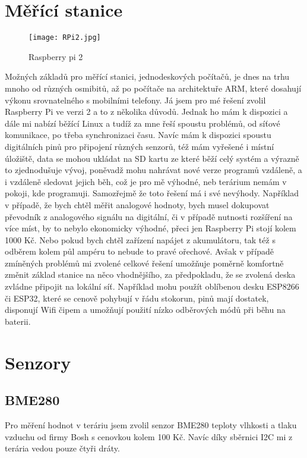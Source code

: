 
\section{Měřící stanice}
\begin{figure}[H]
    \centering
    \texttt{[image: RPi2.jpg]}
    \caption{Raspberry pi 2}
\end{figure}
Možných základů pro měřící stanici, jednodeskových počítačů, je dnes na trhu mnoho od různých osmibitů, až po počítače 
na architektuře ARM,  které dosahují výkonu srovnatelného s mobilními telefony. Já jsem pro mé řešení zvolil Raspberry 
Pi ve verzi 2 a to z několika důvodů. Jednak ho mám k dispozici a dále mi nabízí běžící Linux a tudíž za mne řeší 
spoustu problémů, od síťové komunikace, po třeba synchronizaci času. Navíc mám k dispozici spoustu digitálních pinů pro 
připojení různých senzorů, též mám vyřešené i místní úložiště, data se mohou ukládat na SD kartu ze které běží celý 
systém a výrazně to zjednodušuje vývoj, poněvadž mohu nahrávat nové verze programů vzdáleně, a i vzdáleně sledovat 
jejich běh, což je pro mě výhodné, neb terárium nemám v pokoji, kde programuji. Samozřejmě že toto řešení má i své 
nevýhody. Například v případě, že bych chtěl měřit analogové hodnoty, bych musel dokupovat převodník z analogového 
signálu na digitální, či v případě nutnosti rozšíření na více míst, by to nebylo ekonomicky výhodné, přeci jen Raspberry 
Pi stojí kolem 1000 Kč. Nebo pokud bych chtěl zařízení napájet z akumulátoru, tak též s odběrem kolem půl ampéru to 
nebude to pravé ořechové. Avšak v případě zmíněných problémů mi zvolené celkové řešení umožňuje poměrně komfortně změnit 
základ stanice na něco vhodnějšího, za předpokladu, že se zvolená deska zvládne připojit na lokální síť. Například mohu 
použít oblíbenou desku ESP8266 či ESP32, které se cenově pohybují v řádu stokorun, pinů mají dostatek, disponují Wifi 
čipem a umožňují použití nízko odběrových módů při běhu na baterii.

\section{Senzory}
\subsection{BME280}
Pro měření hodnot v teráriu jsem zvolil senzor BME280 teploty vlhkosti a tlaku vzduchu od firmy Bosh s cenovkou kolem 
100 Kč. Navíc díky sběrnici \gls{I2C} mi z terária vedou pouze čtyři dráty.

